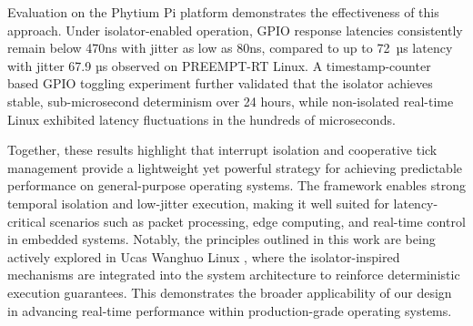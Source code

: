 \documentclass[letterpaper]{article}
\begin{document}
Evaluation on the Phytium Pi platform demonstrates the effectiveness of this approach. Under isolator-enabled operation, GPIO response latencies consistently remain below 470ns with jitter as low as 80ns, compared to up to 72~µs latency with jitter 67.9 µs observed on PREEMPT-RT Linux. A timestamp-counter based GPIO toggling experiment further validated that the isolator achieves stable, sub-microsecond determinism over 24 hours, while non-isolated real-time Linux exhibited latency fluctuations in the hundreds of microseconds.

Together, these results highlight that interrupt isolation and cooperative tick management provide a lightweight yet powerful strategy for achieving predictable performance on general-purpose operating systems. The framework enables strong temporal isolation and low-jitter execution, making it well suited for latency-critical scenarios such as packet processing, edge computing, and real-time control in embedded systems. Notably, the principles outlined in this work are being actively explored in Ucas Wanghuo Linux \cite{zhou2025linux}, where the isolator-inspired mechanisms are integrated into the system architecture to reinforce deterministic execution guarantees. This demonstrates the broader applicability of our design in advancing real-time performance within production-grade operating systems.

\newpage
 



% 
\end{document}
